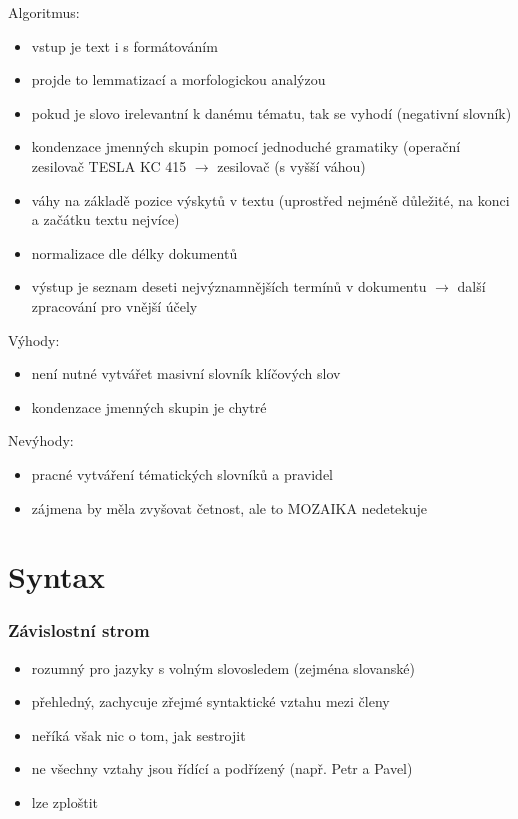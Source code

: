 \documentclass[a4paper]{article}
\begin{document}
Algoritmus: \begin{itemize}
\item vstup je text i s formátováním
\item projde to lemmatizací a morfologickou analýzou
\item pokud je slovo irelevantní k danému tématu, tak se vyhodí (negativní slovník)
\item kondenzace jmenných skupin pomocí jednoduché gramatiky (operační zesilovač TESLA KC 415 $\rightarrow$ zesilovač (s vyšší váhou)
\item váhy na základě pozice výskytů v textu (uprostřed nejméně důležité, na konci a začátku textu nejvíce)
\item normalizace dle délky dokumentů
\item výstup je seznam deseti nejvýznamnějších termínů v dokumentu $\rightarrow$ další zpracování pro vnější účely
\end{itemize}

Výhody: \begin{itemize}
\item není nutné vytvářet masivní slovník klíčových slov
\item kondenzace jmenných skupin je chytré
\end{itemize}

Nevýhody: \begin{itemize}
\item pracné vytváření tématických slovníků a pravidel
\item zájmena by měla zvyšovat četnost, ale to MOZAIKA nedetekuje
\end{itemize}

\pagebreak
\section*{Syntax}
\subsubsection*{Závislostní strom}
\begin{itemize}
\item rozumný pro jazyky s volným slovosledem (zejména slovanské)
\item přehledný, zachycuje zřejmé syntaktické vztahu mezi členy
\item neříká však nic o tom, jak sestrojit
\item ne všechny vztahy jsou řídící a podřízený (např. Petr a Pavel)
\item lze zploštit
\end{itemize}
\end{document}
